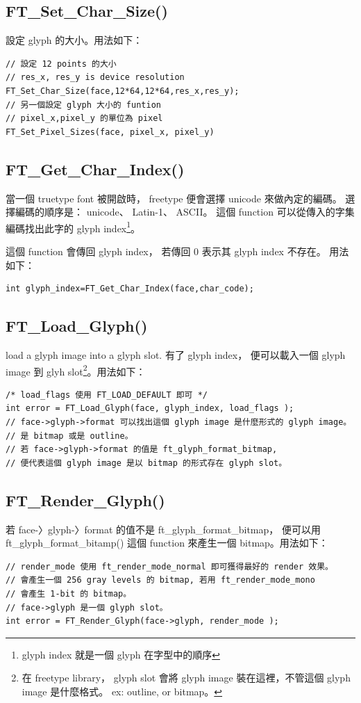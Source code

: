 \documentclass[12pt,a4]{article}
\begin{document}
\begin{CJK}{UTF8}{bsmi}
\subsection{FT\_{}Set\_{}Char\_{}Size()}
設定 glyph 的大小。用法如下：
\begin{Verbatim}[commandchars=@\[\]]
// 設定 12 points 的大小
// res_x, res_y is device resolution
FT_Set_Char_Size(face,12*64,12*64,res_x,res_y);
// 另一個設定 glyph 大小的 funtion
// pixel_x,pixel_y 的單位為 pixel
FT_Set_Pixel_Sizes(face, pixel_x, pixel_y)
\end{Verbatim}
\subsection{FT\_{}Get\_{}Char\_{}Index()}
當一個 truetype font 被開啟時， freetype 便會選擇 unicode 來做內定的編碼。
選擇編碼的順序是： unicode、 Latin-1、 ASCII。
這個 function 可以從傳入的字集編碼找出此字的 glyph index\footnote{glyph index 就是一個 glyph 在字型中的順序}。

這個 function 會傳回 glyph index， 若傳回 0 表示其 glyph index 不存在。 用法如下：
\begin{Verbatim}[commandchars=@\[\]]
int glyph_index=FT_Get_Char_Index(face,char_code);
\end{Verbatim}
\subsection{FT\_{}Load\_{}Glyph()}
load a glyph image into a glyph slot. 有了 glyph index， 便可以載入一個 glyph image 到 glyh slot\footnote{在 freetype library， glyph slot 會將 glyph image 裝在這裡，不管這個 glyph image 是什麼格式。 ex: outline, or bitmap。}。用法如下：

\begin{Verbatim}[commandchars=@\[\]]
/* load_flags 使用 FT_LOAD_DEFAULT 即可 */
int error = FT_Load_Glyph(face, glyph_index, load_flags );  
// face->glyph->format 可以找出這個 glyph image 是什麼形式的 glyph image。
// 是 bitmap 或是 outline。
// 若 face->glyph->format 的值是 ft_glyph_format_bitmap,
// 便代表這個 glyph image 是以 bitmap 的形式存在 glyph slot。
\end{Verbatim}

\subsection{FT\_{}Render\_{}Glyph()}
若 face-〉glyph-〉format 的值不是  ft\_{}glyph\_{}format\_{}bitmap， 便可以用  
ft\_{}glyph\_{}format\_{}bitamp() 這個 function 來產生一個 bitmap。用法如下：
\begin{Verbatim}[commandchars=@\[\]]
// render_mode 使用 ft_render_mode_normal 即可獲得最好的 render 效果。
// 會產生一個 256 gray levels 的 bitmap, 若用 ft_render_mode_mono
// 會產生 1-bit 的 bitmap。
// face->glyph 是一個 glyph slot。
int error = FT_Render_Glyph(face->glyph, render_mode );
\end{Verbatim}
\newpage

\end{CJK}
\end{document}
